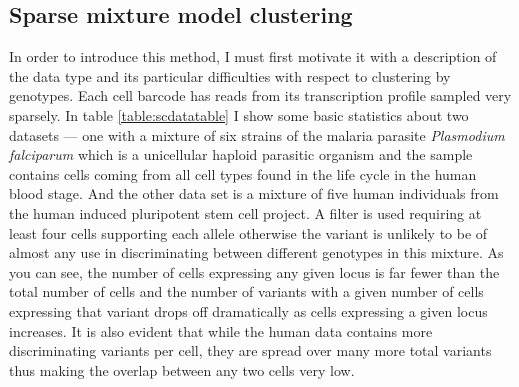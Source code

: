 \subsection{Sparse mixture model clustering}
\par{
In order to introduce this method, I must first motivate it with a description of the data type and its particular difficulties with respect to clustering by genotypes. Each cell barcode has reads from its transcription profile sampled very sparsely. In table \ref{table:scdatatable} I show some basic statistics about two datasets --- one with a mixture of six strains of the malaria parasite \textit{Plasmodium falciparum} which is a unicellular haploid parasitic organism and the sample contains cells coming from all cell types found in the life cycle in the human blood stage. And the other data set is a mixture 
of five human individuals from the human induced pluripotent stem cell project. A filter is used requiring at least four cells supporting each allele otherwise the variant is unlikely to be of almost any use in discriminating between different genotypes in this mixture. 
As you can see, the number of cells expressing any given locus is far fewer than the total number of cells and the number of variants with a given number of cells expressing that variant drops off dramatically as cells expressing a given locus increases. It is also evident that while the human data contains more discriminating variants per cell, they are spread over many more total variants thus making the overlap between any two cells very low.
}

